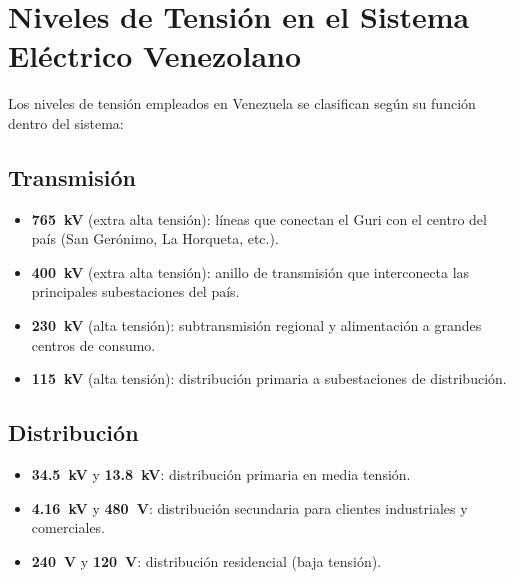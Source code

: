 \documentclass[12pt,a4paper]{article}
\begin{document}
\section{Niveles de Tensión en el Sistema Eléctrico Venezolano}

Los niveles de tensión empleados en Venezuela se clasifican según su
función dentro del sistema:

\subsection{Transmisión}

\begin{itemize}[nosep]
    \item \textbf{\SI{765}{\kilo\volt}} (extra alta tensión): líneas que
          conectan el Guri con el centro del país (San Gerónimo, La
          Horqueta, etc.).
    \item \textbf{\SI{400}{\kilo\volt}} (extra alta tensión): anillo de
          transmisión que interconecta las principales subestaciones del
          país.
    \item \textbf{\SI{230}{\kilo\volt}} (alta tensión): subtransmisión
          regional y alimentación a grandes centros de consumo.
    \item \textbf{\SI{115}{\kilo\volt}} (alta tensión): distribución
          primaria a subestaciones de distribución.
\end{itemize}

\subsection{Distribución}

\begin{itemize}[nosep]
    \item \textbf{\SI{34.5}{\kilo\volt}} y \textbf{\SI{13.8}{\kilo\volt}}:
          distribución primaria en media tensión.
    \item \textbf{\SI{4.16}{\kilo\volt}} y \textbf{\SI{480}{\volt}}:
          distribución secundaria para clientes industriales y
          comerciales.
    \item \textbf{\SI{240}{\volt}} y \textbf{\SI{120}{\volt}}:
          distribución residencial (baja tensión).
\end{itemize}

\end{document}
